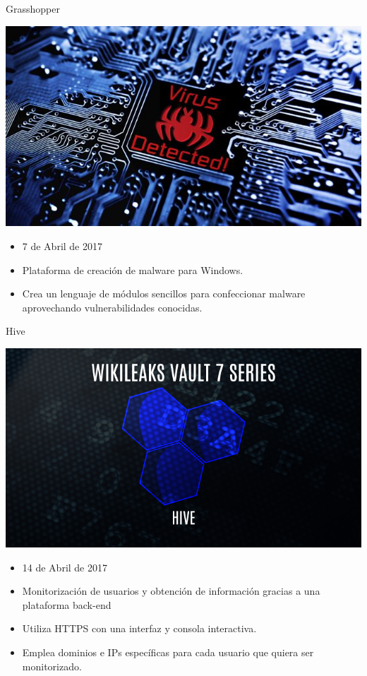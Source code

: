\documentclass[10pt]{beamer}
\begin{document}
\begin{frame}{Grasshopper}
	\pause
	\begin{center}
		\includegraphics[scale=0.3]{./Imagenes/grasshopper.jpg}
	\end{center}
	\pause
	\begin{itemize}
		\item 7 de Abril de 2017
		\pause
		\item Plataforma de creación de malware para Windows.
		\pause
		\item Crea un lenguaje de módulos sencillos para confeccionar malware aprovechando vulnerabilidades conocidas.
	\end{itemize}
\end{frame}

\begin{frame}{Hive}
	\pause
	\begin{center}
		\includegraphics[scale=0.3]{./Imagenes/hive.jpg}
	\end{center}
	\pause
	\begin{itemize}
		\item 14 de Abril de 2017
		\pause
		\item Monitorización de usuarios y obtención de información gracias a una plataforma back-end
		\pause
		\item Utiliza HTTPS con una interfaz y consola interactiva.
		\pause
		\item Emplea dominios e IPs específicas para cada usuario que quiera ser monitorizado.
	\end{itemize}
\end{frame}
\end{document}
